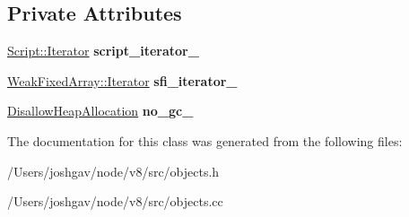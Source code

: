 \subsection*{Private Attributes}
\begin{DoxyCompactItemize}
\item 
\hyperlink{classv8_1_1internal_1_1_script_1_1_iterator}{Script\+::\+Iterator} {\bfseries script\+\_\+iterator\+\_\+}\hypertarget{classv8_1_1internal_1_1_shared_function_info_1_1_iterator_a26d014d486d231772621c0055adc81f9}{}\label{classv8_1_1internal_1_1_shared_function_info_1_1_iterator_a26d014d486d231772621c0055adc81f9}

\item 
\hyperlink{classv8_1_1internal_1_1_weak_fixed_array_1_1_iterator}{Weak\+Fixed\+Array\+::\+Iterator} {\bfseries sfi\+\_\+iterator\+\_\+}\hypertarget{classv8_1_1internal_1_1_shared_function_info_1_1_iterator_a3dc7d4009682b5639ab702e918bfd104}{}\label{classv8_1_1internal_1_1_shared_function_info_1_1_iterator_a3dc7d4009682b5639ab702e918bfd104}

\item 
\hyperlink{classv8_1_1internal_1_1_per_thread_assert_scope_debug_only}{Disallow\+Heap\+Allocation} {\bfseries no\+\_\+gc\+\_\+}\hypertarget{classv8_1_1internal_1_1_shared_function_info_1_1_iterator_a46d03612f64862d974af065df182ca01}{}\label{classv8_1_1internal_1_1_shared_function_info_1_1_iterator_a46d03612f64862d974af065df182ca01}

\end{DoxyCompactItemize}


The documentation for this class was generated from the following files\+:\begin{DoxyCompactItemize}
\item 
/\+Users/joshgav/node/v8/src/objects.\+h\item 
/\+Users/joshgav/node/v8/src/objects.\+cc\end{DoxyCompactItemize}
